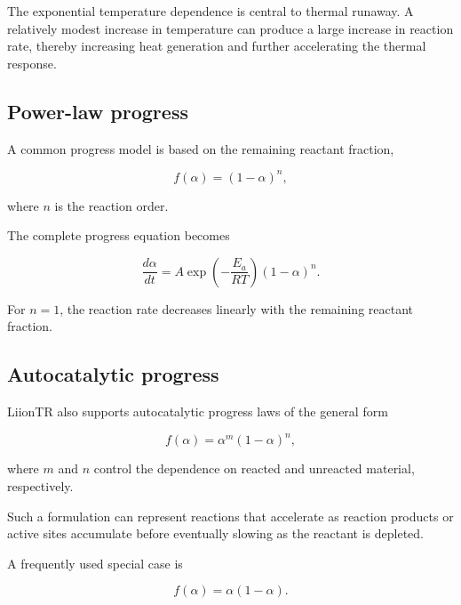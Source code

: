 The exponential temperature dependence is central to thermal runaway.
A relatively modest increase in temperature can produce a large increase
in reaction rate, thereby increasing heat generation and further
accelerating the thermal response.


\subsection{Power-law progress}

A common progress model is based on the remaining reactant fraction,

\begin{equation}
    f(\alpha)
    =
    \left(
        1-\alpha
    \right)^n,
    \label{eq:power_law_progress}
\end{equation}

where $n$ is the reaction order.

The complete progress equation becomes

\begin{equation}
    \frac{d\alpha}{dt}
    =
    A
    \exp
    \left(
        -\frac{E_a}{RT}
    \right)
    \left(
        1-\alpha
    \right)^n.
\end{equation}

For $n=1$, the reaction rate decreases linearly with the remaining
reactant fraction.


\subsection{Autocatalytic progress}

LiionTR also supports autocatalytic progress laws of the general form

\begin{equation}
    f(\alpha)
    =
    \alpha^m
    \left(
        1-\alpha
    \right)^n,
    \label{eq:autocatalytic_progress}
\end{equation}

where $m$ and $n$ control the dependence on reacted and unreacted
material, respectively.

Such a formulation can represent reactions that accelerate as reaction
products or active sites accumulate before eventually slowing as the
reactant is depleted.

A frequently used special case is

\begin{equation}
    f(\alpha)
    =
    \alpha
    \left(
        1-\alpha
    \right).
\end{equation}


